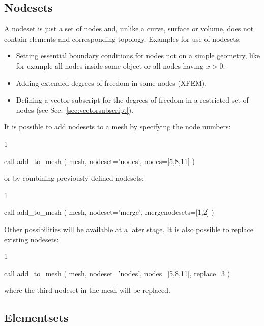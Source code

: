 \subsection{Nodesets}
\label{sec:nodesets}

A nodeset is just a set of nodes and, unlike a curve, surface or volume, does
not contain elements and corresponding topology. Examples for use of nodesets:
\begin{itemize}
   \item Setting essential boundary conditions for nodes not on a simple
         geometry, like for example all nodes inside some object or all nodes 
         having $x>0$.
   \item Adding extended degrees of freedom in some nodes (XFEM).
   \item Defining a vector subscript for the degrees of freedom in a
         restricted set of nodes (see Sec.~\ref{sec:vectorsubscript}).
\end{itemize}
It is possible to add nodesets to a mesh by specifying the node numbers:
\begin{listing}{1}

  call add_to_mesh ( mesh, nodeset='nodes', nodes=[5,8,11] )
   
\end{listing}
or by combining previously defined nodesets:
\begin{listing}{1}

  call add_to_mesh ( mesh, nodeset='merge', mergenodesets=[1,2] )
   
\end{listing}
Other possibilities will be available at a later stage.
It is also possible to replace existing nodesets:
\begin{listing}{1}

  call add_to_mesh ( mesh, nodeset='nodes', nodes=[5,8,11], replace=3 )
   
\end{listing}
where the third nodeset in the mesh will be replaced.

\subsection{Elementsets}
\label{sec:elementsets}

